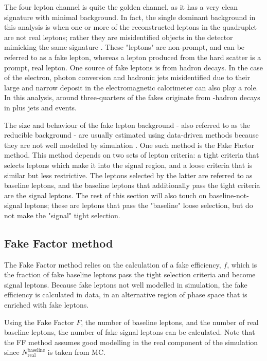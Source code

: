 The four lepton channel is quite the golden channel, as it has a very clean signature with minimal background. In fact, the single dominant background in this analysis is when one or more of the reconstructed leptons in the quadruplet are not real leptons; rather they are misidentified objects in the detector mimicking the same signature \cite{varnes2016poisson}. These "leptons" are non-prompt, and can be referred to as a fake lepton, whereas a lepton produced from the hard scatter is a prompt, real lepton. One source of fake leptons is from hadron decays. In the case of the electron, photon conversion and hadronic jets misidentified due to their large and narrow deposit in the electromagnetic calorimeter can also play a role. In this analysis, around three-quarters of the fakes originate from \Pbottom-hadron decays in \Z plus jets and \Ptop\APtop events. 

The size and behaviour of the fake lepton background - also referred to as the reducible background - are usually estimated using data-driven methods because they are not well modelled by simulation \cite{varnes2016poisson}. One such method is the Fake Factor method. This method depends on two sets of lepton criteria: a tight criteria that selects leptons which make it into the signal region, and a loose criteria that is similar but less restrictive. The leptons selected by the latter are referred to as baseline leptons, and the baseline leptons that additionally pass the tight criteria are the signal leptons. The rest of this section will also touch on baseline-not-signal leptons; these are leptons that pass the "baseline" loose selection, but do not make the "signal" tight selection. 

\subsection{Fake Factor method}

The Fake Factor method relies on the calculation of a fake efficiency, $f$, which is the fraction of fake baseline leptons pass the tight selection criteria and become signal leptons. Because fake leptons not well modelled in simulation, the fake efficiency is calculated in data, in an alternative region of phase space that is enriched with fake leptons. 

Using the Fake Factor $F$, the number of baseline leptons, and the number of real baseline leptons, the number of fake signal leptons can be calculated. Note that the FF method assumes good modelling in the real component of the simulation since $N^{\text{baseline}}_{\text{real}}$ is taken from MC.


